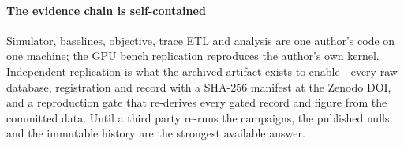\paragraph{The evidence chain is self-contained} Simulator, baselines,
objective, trace ETL and analysis are one author's code on one machine;
the GPU bench replication reproduces the author's own kernel. Independent
replication is what the archived artifact exists to enable---every raw
database, registration and record with a SHA-256 manifest at the Zenodo
DOI, and a reproduction gate that re-derives every gated record and figure
from the committed data. Until a third party re-runs the campaigns, the
published nulls and the immutable history are the strongest available
answer.
